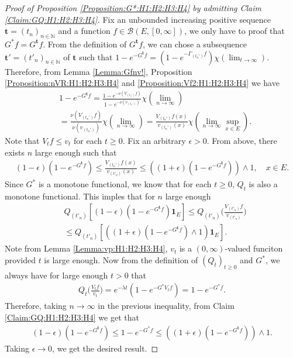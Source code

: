 \documentclass[12pt,a4paper]{amsart}
\numberwithin{equation}{section}
\theoremstyle{plain}
\theoremstyle{definition}
\theoremstyle{remark}
\begin{document}
\begin{proof}[Proof of Proposition \ref{Proposition:G*:H1:H2:H3:H4} by admitting Claim \ref{Claim:GQ:H1:H2:H3:H4}]
Fix an unbounded increasing positive sequence $\mathbf t=(t_n)_{n\in \mathbb N}$ and a function $f\in \mathcal B(E,[0,\infty])$, we only have to proof that $G^* f = G^{\mathbf t}f.$ 
From the definition of $G^{\mathbf t} f$, we can chose a subsequence $\mathbf t'=(t'_n)_{n \in \mathbb N}$ of $\mathbf t$ such that $ 1 - e^{- G^{\mathbf t}f} =  ( 1 - e^{-\Gamma_{( t_n')} f} ) \chi(
\lim_{t\to \infty}). $ 
Therefore, from Lemma \ref{Lemma:Gfnv!}, Proposition \ref{Proposition:nVR:H1:H2:H3:H4} and \ref{Proposition:Vf2:H1:H2:H3:H4} we have
\begin{align}
   & 1 - e^{- G^{\mathbf t}f}
   = \frac{1 - e^{- \nu( V_{(t_n')}f)}}{1- e^{- \nu(v_{(t_n')})}}  \chi(\lim_{n\to \infty}) 
 \\& = \frac{\nu (V_{(t_n')} f)}{\nu(v_{(t_n')})} \chi(\lim_{n\to \infty}) 
   =  \frac{V_{(t_n')}f(x)}{v_{(t_n')}(x)}  \chi(\lim_{n \to \infty} \sup_{x\in E}).
 \end{align}
Note that $V_tf \leq v_t$ for each $t\geq 0$. 
Fix an arbitrary $\epsilon > 0$. 
From above, there exists $n$ large enough such that
\begin{align}
   (1-\epsilon) (1 - e^{- G^{\mathbf t}f} )
   \leq \frac{V_{(t_n')}f(x)}{v_{(t'_n)}(x)}
   \leq ((1+\epsilon) ( 1 - e^{- G^{\mathbf t}f} )) \wedge 1,
   \quad x\in E.
 \end{align}
Since $G^*$ is a monotone functional, we know that for each $t\geq 0$, $Q_t$ is also a monotone functional.
This imples that for $n$ large enough 
\begin{align}
 & Q_{(t'_n)}[ (1-\epsilon) (1-e^{-G^{\mathbf t}f})\mathbf 1_E ]
   \leq Q_{(t'_n)}\Big( \frac{V_{(t'_n)}f}{v_{(t'_n)}} \Big) 
   \\ &  \leq Q_{(t'_n)}[ ( (1+\epsilon) (1-e^{-G^{\mathbf t}f}) \wedge 1) \mathbf 1_E ].
 \end{align}
Note from Lemma \ref{Lemma:vp:H1:H2:H3:H4}, $v_t$ is a $(0,\infty)$-valued funciton provided $t$ is large enough. 
Now from the definition of $(Q_t)_{t\geq 0}$ and $G^*$, we always have for large enough $t>0$ that
\begin{align}
 Q_t \Big( \frac{V_tf}{v_t}  \Big) 
   = e^{- \lambda t}( 1 - e^{- G^*V_tf}  )
   = 1- e^{- G^* f}.
 \end{align}
Therefore, taking $n \to \infty$ in the previous inequality, from Claim \ref{Claim:GQ:H1:H2:H3:H4}  we get that
\begin{align}
 (1 - \epsilon) (1 - e^{- G^{\mathbf t}f})
   \leq 1 - e^{- G^* f} 
   \leq ((1 + \epsilon) (1 - e^{- G^{\mathbf t} f}))\wedge 1.
 \end{align}
Taking $\epsilon \to 0$, we get the desired result.
\end{proof}
\end{document}
